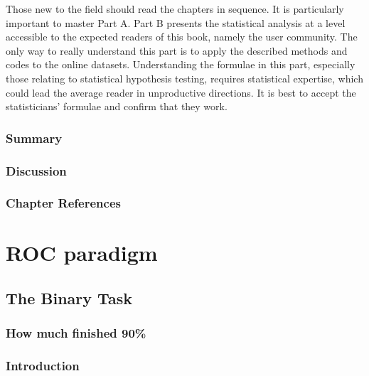 \documentclass[
]{book}
\begin{document}
Those new to the field should read the chapters in sequence. It is particularly important to master Part A. Part B presents the statistical analysis at a level accessible to the expected readers of this book, namely the user community. The only way to really understand this part is to apply the described methods and codes to the online datasets. Understanding the formulae in this part, especially those relating to statistical hypothesis testing, requires statistical expertise, which could lead the average reader in unproductive directions. It is best to accept the statisticians' formulae and confirm that they work.

\hypertarget{overview-Summary}{%
\section{Summary}\label{overview-Summary}}

\hypertarget{overview-Discussion}{%
\section{Discussion}\label{overview-Discussion}}

\hypertarget{overview-references}{%
\section{Chapter References}\label{overview-references}}

\hypertarget{part-roc-paradigm}{%
\part*{ROC paradigm}\label{part-roc-paradigm}}

\hypertarget{binary-task}{%
\chapter{The Binary Task}\label{binary-task}}

\hypertarget{binary-task-how-much-finished}{%
\section{How much finished 90\%}\label{binary-task-how-much-finished}}

\hypertarget{binary-taskIntro}{%
\section{Introduction}\label{binary-taskIntro}}
\end{document}
